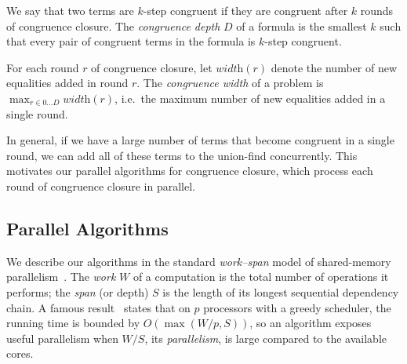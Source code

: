 \begin{definition}
    \label{def:depth}
    We say that two terms are $k$-step congruent if they are congruent after
    $k$ rounds of congruence closure. The \emph{congruence depth} $D$ of a
    formula is the smallest $k$ such that every pair of congruent terms in
    the formula is $k$-step congruent.
\end{definition}

\begin{definition}
    For each round $r$ of congruence closure, let $\textit{width}(r)$ denote
    the number of new equalities added in round $r$. The \emph{congruence
    width} of a problem is $\max_{r \in 0 \ldots D} \textit{width}(r)$, i.e.\
    the maximum number of new equalities added in a single round.
\end{definition}

In general, if we have a large number of terms that become congruent in a single
round, we can add all of these terms to the union-find concurrently. This
motivates our parallel algorithms for congruence closure, which process each
round of congruence closure in parallel.






\subsection{Parallel Algorithms}
\label{sec:bg:parallel}

We describe our algorithms in the standard \emph{work--span} model of
shared-memory parallelism~\cite{parallel-algos}. The \emph{work} $W$ of a
computation is the total number of operations it performs; the \emph{span} (or
depth) $S$ is the length of its longest sequential dependency chain. A famous
result~\cite{brent1974,graham1969} states that on $p$ processors with a greedy
scheduler, the running time
is bounded by $O(\max(W/p, S))$, so an algorithm exposes useful parallelism when
$W/S$, its \emph{parallelism}, is large compared to the available cores.


